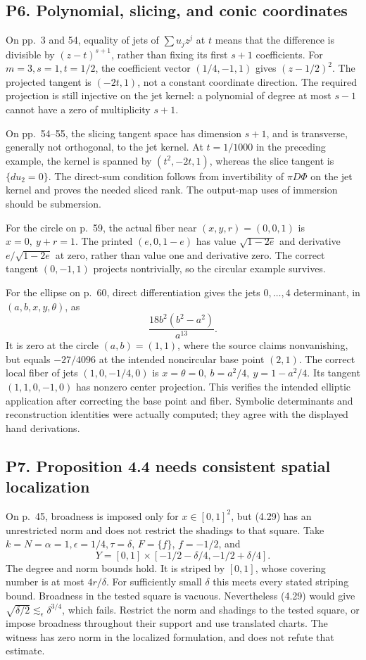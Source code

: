 \documentclass[10pt]{article}
\begin{document}
\subsection*{P6. Polynomial, slicing, and conic coordinates}
On pp. 3 and 54, equality of jets of \(\sum u_jz^j\) at \(t\) means that the difference is divisible by \((z-t)^{s+1}\), rather than fixing its first \(s+1\) coefficients. For \(m=3,s=1,t=1/2\), the coefficient vector \((1/4,-1,1)\) gives \((z-1/2)^2\). The projected tangent is \((-2t,1)\), not a constant coordinate direction. The required projection is still injective on the jet kernel: a polynomial of degree at most \(s-1\) cannot have a zero of multiplicity \(s+1\).\par
On pp. 54–55, the slicing tangent space has dimension \(s+1\), and is transverse, generally not orthogonal, to the jet kernel. At \(t=1/1000\) in the preceding example, the kernel is spanned by \((t^2,-2t,1)\), whereas the slice tangent is \(\{du_2=0\}\). The direct-sum condition follows from invertibility of \(\pi D\Phi\) on the jet kernel and proves the needed sliced rank. The output-map uses of immersion should be submersion.\par
For the circle on p. 59, the actual fiber near \((x,y,r)=(0,0,1)\) is \(x=0,\ y+r=1\). The printed \((e,0,1-e)\) has value \(\sqrt{1-2e}\) and derivative \(e/\sqrt{1-2e}\) at zero, rather than value one and derivative zero. The correct tangent \((0,-1,1)\) projects nontrivially, so the circular example survives.\par
For the ellipse on p. 60, direct differentiation gives the jets \(0,\ldots,4\) determinant, in \((a,b,x,y,\theta)\), as \[\frac{18b^2(b^2-a^2)}{a^{13}}.\] It is zero at the circle \((a,b)=(1,1)\), where the source claims nonvanishing, but equals \(-27/4096\) at the intended noncircular base point \((2,1)\). The correct local fiber of jets \((1,0,-1/4,0)\) is \(x=\theta=0,\ b=a^2/4,\ y=1-a^2/4\). Its tangent \((1,1,0,-1,0)\) has nonzero center projection. This verifies the intended elliptic application after correcting the base point and fiber. Symbolic determinants and reconstruction identities were actually computed; they agree with the displayed hand derivations.\par
\subsection*{P7. Proposition 4.4 needs consistent spatial localization}
On p. 45, broadness is imposed only for \(x\in[0,1]^2\), but (4.29) has an unrestricted norm and does not restrict the shadings to that square. Take \(k=N=\alpha=1,\epsilon=1/4,\tau=\delta\), \(F=\{f\}\), \(f=-1/2\), and \[Y=[0,1]\times[-1/2-\delta/4,-1/2+\delta/4].\] The degree and norm bounds hold. It is striped by \([0,1]\), whose covering number is at most \(4r/\delta\). For sufficiently small \(\delta\) this meets every stated striping bound. Broadness in the tested square is vacuous. Nevertheless (4.29) would give \(\sqrt{\delta/2}\lesssim_\epsilon\delta^{3/4}\), which fails. Restrict the norm and shadings to the tested square, or impose broadness throughout their support and use translated charts. The witness has zero norm in the localized formulation, and does not refute that estimate.\par
\end{document}
